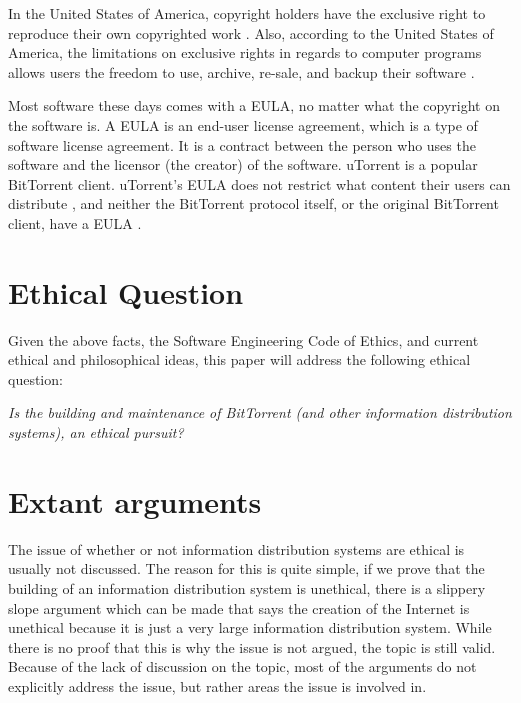 \documentclass[11pt]{article}
\begin{document}
\begin{multicols}{2}
In the United States of America, copyright holders have the exclusive right to reproduce their own copyrighted work \cite{t17c1s106}. Also, according to the United States of America, the limitations on exclusive rights in regards to computer programs allows users the freedom to use, archive, re-sale, and backup their software \cite{t17s117}.

Most software these days comes with a EULA, no matter what the copyright on the software is. A EULA is an end-user license agreement, which is a type of software license agreement. It is a contract between the person who uses the software and the licensor (the creator) of the software. uTorrent is a popular BitTorrent client. uTorrent's EULA does not restrict what content their users can distribute \cite{utorrentEula}, and neither the BitTorrent protocol itself, or the original BitTorrent client, have a EULA \cite{utorrentEula}.

\section{Ethical Question}

Given the above facts, the Software Engineering Code of Ethics, and current ethical and philosophical ideas, this paper will address the following ethical question:

\textit{Is the building and maintenance of BitTorrent (and other information distribution systems), an ethical pursuit?}

\section{Extant arguments}

The issue of whether or not information distribution systems are ethical is usually not discussed. The reason for this is quite simple, if we prove that the building of an information distribution system is unethical, there is a slippery slope argument which can be made that says the creation of the Internet is unethical because it is just a very large information distribution system. While there is no proof that this is why the issue is not argued, the topic is still valid. Because of the lack of discussion on the topic, most of the arguments do not explicitly address the issue, but rather areas the issue is involved in.


\end{multicols}
\end{document}
